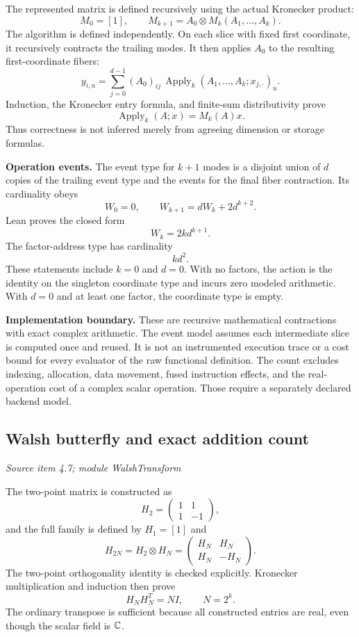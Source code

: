 The represented matrix is defined recursively using the actual Kronecker product:
\[
M_0=[1],\qquad M_{k+1}=A_0\otimes M_k(A_1,\ldots,A_k).
\]
The algorithm is defined independently. On each slice with fixed first coordinate, it recursively contracts the trailing modes. It then applies $A_0$ to the resulting first-coordinate fibers:
\[
y_{i,u}=\sum_{j=0}^{d-1}(A_0)_{ij}\,
\operatorname{Apply}_{k}(A_1,\ldots,A_k;x_{j,\cdot})_u.
\]
Induction, the Kronecker entry formula, and finite-sum distributivity prove
\[
\boxed{\operatorname{Apply}_k(A;x)=M_k(A)x.}
\]
Thus correctness is not inferred merely from agreeing dimension or storage formulas.

\textbf{Operation events.} The event type for $k+1$ modes is a disjoint union of $d$ copies of the trailing event type and the events for the final fiber contraction. Its cardinality obeys
\[
W_0=0,\qquad W_{k+1}=dW_k+2d^{k+2}.
\]
Lean proves the closed form
\[
\boxed{W_k=2kd^{k+1}.}
\]
The factor-address type has cardinality
\[
\boxed{k d^2.}
\]
These statements include $k=0$ and $d=0$. With no factors, the action is the identity on the singleton coordinate type and incurs zero modeled arithmetic. With $d=0$ and at least one factor, the coordinate type is empty.

\textbf{Implementation boundary.} These are recursive mathematical contractions with exact complex arithmetic. The event model assumes each intermediate slice is computed once and reused. It is not an instrumented execution trace or a cost bound for every evaluator of the raw functional definition. The count excludes indexing, allocation, data movement, fused instruction effects, and the real-operation cost of a complex scalar operation. Those require a separately declared backend model.



\subsection{Walsh butterfly and exact addition count}\label{supp4:subsection:004}\textit{Source item 4.7; module WalshTransform}\par
The two-point matrix is constructed as
\[
H_2=\begin{pmatrix}1&1\\1&-1\end{pmatrix},
\]
and the full family is defined by $H_1=[1]$ and
\[
H_{2N}=H_2\otimes H_N
=\begin{pmatrix}H_N&H_N\\H_N&-H_N\end{pmatrix}.
\]
The two-point orthogonality identity is checked explicitly. Kronecker multiplication and induction then prove
\[
\boxed{H_NH_N^T=NI,\qquad N=2^k.}
\]
The ordinary transpose is sufficient because all constructed entries are real, even though the scalar field is $\C$.

